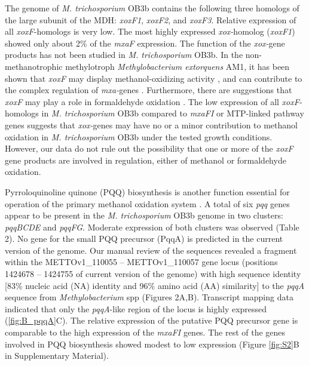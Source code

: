 The genome of \textit{M. trichosporium} OB3b contains the following three homologs of the large subunit of the MDH: \textit{xoxF1}, \textit{xoxF2}, and \textit{xoxF3}.
Relative expression of all \textit{xoxF}-homologs is very low.
The most highly expressed \textit{xox-}homolog (\textit{xoxF1}) showed only about 2\% of the \textit{mxaF} expression.
The function of the \textit{xox-}gene products has not been studied in \textit{M. trichosporium} OB3b.
In the non-methanotrophic methylotroph \textit{Methylobacterium extorquens} AM1, it has been shown that \textit{xoxF} may display methanol-oxidizing activity \cite{schmidt2010}, and can contribute to the complex regulation of \textit{mxa-}genes \cite{skovran2011}.
Furthermore, there are suggestions that \textit{xoxF} may play a role in formaldehyde oxidation \cite{wilson2008}.
The low expression of all \textit{xoxF}-homologs in \textit{M. trichosporium} OB3b compared to \textit{mxaFI} or MTP-linked pathway genes suggests that \textit{xox-}genes may have no or a minor contribution to methanol oxidation in \textit{M. trichosporium} OB3b under the tested growth conditions.
However, our data do not rule out the possibility that one or more of the \textit{xoxF} gene products are involved in regulation, either of methanol or formaldehyde oxidation.

Pyrroloquinoline quinone (PQQ) biosynthesis is another function essential for operation of the primary methanol oxidation system \cite{toyama1997, anthony2002}.
A total of six \textit{pqq} genes appear to be present in the \textit{M. trichosporium} OB3b genome in two clusters: \textit{pqqBCDE} and \textit{pqqFG}.
Moderate expression of both clusters was observed (Table 2).
No gene for the small PQQ precursor (PqqA) is predicted in the current version of the genome.
Our manual review of the sequences revealed a fragment within the METTOv1\_110055 – METTOv1\_110057 gene locus (positions 1424678 – 1424755 of current version of the genome) with high sequence identity [83\% nucleic acid (NA) identity and 96\% amino acid (AA) similarity] to the \textit{pqqA} sequence from \textit{Methylobacterium} spp (Figures 2A,B).
Transcript mapping data indicated that only the \textit{pqqA}-like region of the locus is highly expressed (\ref{fig:B_pqqA}C).
The relative expression of the putative PQQ precursor gene is comparable to the high expression of the \textit{mxaFI} genes.
The rest of the genes involved in PQQ biosynthesis showed modest to low expression (Figure \ref{fig:S2}B in Supplementary Material).

